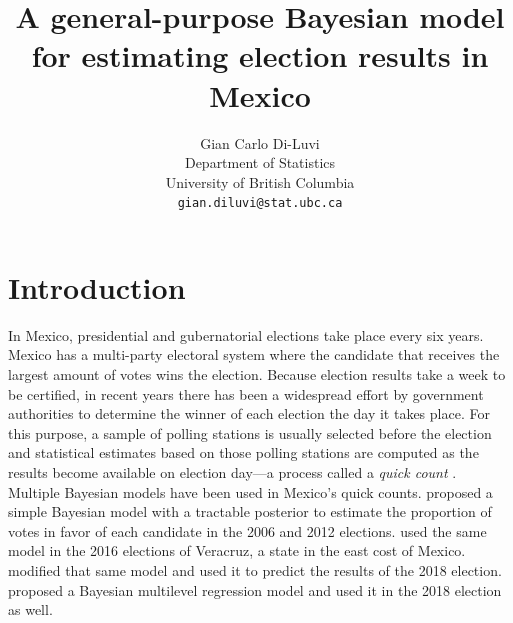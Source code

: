 \documentclass{article}
\title{A general-purpose Bayesian model for estimating election results in Mexico}
\author{%
  Gian Carlo Di-Luvi \\
  Department of Statistics\\
  University of British Columbia \\
  \texttt{gian.diluvi@stat.ubc.ca}
}
\begin{document}
\maketitle




\section{Introduction} \label{sec:intro}


In Mexico, presidential and gubernatorial elections take place every six years. Mexico has a multi-party electoral system where the candidate that receives the largest amount of votes wins the election. Because election results take a week to be certified, in recent years there has been a widespread effort by government authorities to determine the winner of each election the day it takes place. For this purpose, a sample of polling stations is usually selected before the election and statistical estimates based on those polling stations are computed as the results become available on election day---a process called a \textit{quick count} \citep{carrera2019}.
\\



Multiple Bayesian models have been used in Mexico's quick counts. \citet{mendoza-nieto2016} proposed a simple Bayesian model with a tractable posterior to estimate the proportion of votes in favor of each candidate in the 2006 and 2012 elections. \citet{cerrillo2019} used the same model in the 2016 elections of Veracruz, a state in the east cost of Mexico. \citet{diluvi2018} modified that same model and used it to predict the results of the 2018 election. \citet{anzarut2018} proposed a Bayesian multilevel regression model and used it in the 2018 election as well.
\\
\end{document}
